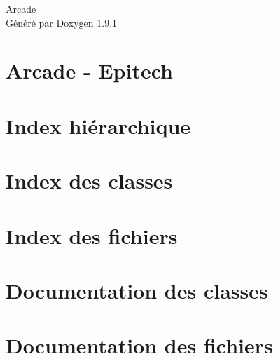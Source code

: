 \let\mypdfximage\pdfximage\def\pdfximage{\immediate\mypdfximage}\documentclass[twoside]{book}
\newcommand{\+}{\discretionary{\mbox{\scriptsize$\hookleftarrow$}}{}{}}
\newcommand{\clearemptydoublepage}{%
  \newpage{\pagestyle{empty}\cleardoublepage}%
}
\begin{document}
\raggedbottom

\hypersetup{pageanchor=false,
             bookmarksnumbered=true,
             pdfencoding=unicode
            }
\begin{titlepage}
\vspace*{7cm}
\begin{center}%
{\Large Arcade }\\
\vspace*{1cm}
{\large Généré par Doxygen 1.9.1}\\
\end{center}
\end{titlepage}
\clearemptydoublepage
{}
\tableofcontents
\clearemptydoublepage
{}
\hypersetup{pageanchor=true}

\chapter{Arcade -\/ Epitech}
\label{index}\hypertarget{index}{}
\chapter{Index hiérarchique}

\chapter{Index des classes}

\chapter{Index des fichiers}

\chapter{Documentation des classes}


















\chapter{Documentation des fichiers}











\backmatter
\newpage
{}
\clearemptydoublepage
{}
\printindex
\end{document}
